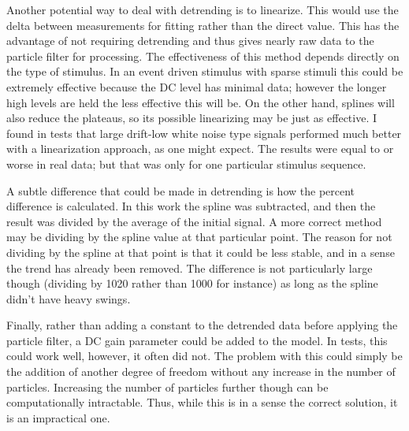 Another potential way to deal with detrending is to 
linearize. This would use the delta between measurements for fitting rather than the 
direct value. This has the advantage of not requiring detrending and thus 
gives nearly raw data to the particle filter
for processing. The effectiveness of this method depends directly on the type of stimulus.
In an event driven stimulus with sparse stimuli this could be extremely effective because
the DC level has minimal data; however the longer high levels are held the less effective
this will be. On the other hand, splines will also reduce the plateaus, so its possible
linearizing may be just as effective. I found in tests that large drift-low white noise
type signals performed much better with a linearization approach, as one might expect. 
The results were equal to or worse in real data; but that was only for one particular
stimulus sequence. 

A subtle difference that could be made in detrending is how the percent difference
is calculated. In this work the spline was subtracted, and then the result
was divided by the average of the initial signal. A more correct method may be dividing
by the spline value at that particular point. The reason for not dividing by the spline
at that point is that it could be less stable, and in a sense the trend has already
been removed. The difference is not particularly large though 
(dividing by 1020 rather than 1000 for instance) as long as the spline didn't have heavy swings. 

Finally, rather than adding a constant to the detrended data before
applying the particle filter, a DC gain parameter could be added to the model. In
tests, this could work well, however, it often did not. The problem with this
could simply be the addition of another degree of freedom without any increase in
the number of particles. Increasing the number of particles further though
can be computationally intractable. Thus, while this is in a sense the correct
solution, it is an impractical one. 

